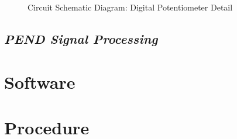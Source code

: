 \documentclass[a4]{report}
\begin{document}
	\begin{figure}[!h]
		\centering
		\caption{Circuit Schematic Diagram: Digital Potentiometer Detail}
		\label{circdigpotclose}
	\end{figure} \newline  \noindent

	\subsection{\textit{PEND Signal Processing}}



	\section{Software}




	\section{Procedure}
\end{document}

